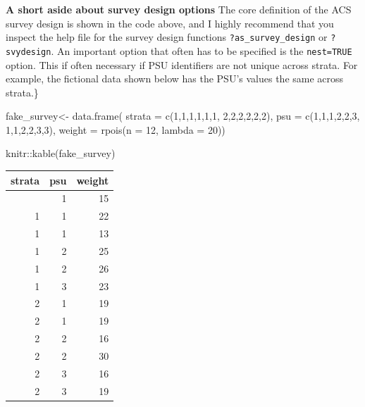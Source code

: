 \documentclass[
  letterpaper,
  DIV=11,
  numbers=noendperiod]{scrreprt}
\newenvironment{Shaded}{\begin{snugshade}}{\end{snugshade}}
\newcommand{\AttributeTok}[1]{\textcolor[rgb]{0.40,0.45,0.13}{#1}}
\newcommand{\DecValTok}[1]{\textcolor[rgb]{0.68,0.00,0.00}{#1}}
\newcommand{\FunctionTok}[1]{\textcolor[rgb]{0.28,0.35,0.67}{#1}}
\newcommand{\NormalTok}[1]{\textcolor[rgb]{0.00,0.23,0.31}{#1}}
\newcommand{\OtherTok}[1]{\textcolor[rgb]{0.00,0.23,0.31}{#1}}
\newcommand{\SpecialCharTok}[1]{\textcolor[rgb]{0.37,0.37,0.37}{#1}}
\begin{document}
\textbf{A short aside about survey design options} The core definition
of the ACS survey design is shown in the code above, and I highly
recommend that you inspect the help file for the survey design functions
\texttt{?as\_survey\_design} or \texttt{?svydesign}. An important option
that often has to be specified is the \texttt{nest=TRUE} option. This if
often necessary if PSU identifiers are not unique across strata. For
example, the fictional data shown below has the PSU's values the same
across strata.\}

\begin{Shaded}
\begin{Highlighting}[]
\NormalTok{fake\_survey}\OtherTok{\textless{}{-}} \FunctionTok{data.frame}\NormalTok{(}
  \AttributeTok{strata =} \FunctionTok{c}\NormalTok{(}\DecValTok{1}\NormalTok{,}\DecValTok{1}\NormalTok{,}\DecValTok{1}\NormalTok{,}\DecValTok{1}\NormalTok{,}\DecValTok{1}\NormalTok{,}\DecValTok{1}\NormalTok{,}
             \DecValTok{2}\NormalTok{,}\DecValTok{2}\NormalTok{,}\DecValTok{2}\NormalTok{,}\DecValTok{2}\NormalTok{,}\DecValTok{2}\NormalTok{,}\DecValTok{2}\NormalTok{),}
  \AttributeTok{psu =} \FunctionTok{c}\NormalTok{(}\DecValTok{1}\NormalTok{,}\DecValTok{1}\NormalTok{,}\DecValTok{1}\NormalTok{,}\DecValTok{2}\NormalTok{,}\DecValTok{2}\NormalTok{,}\DecValTok{3}\NormalTok{,}
          \DecValTok{1}\NormalTok{,}\DecValTok{1}\NormalTok{,}\DecValTok{2}\NormalTok{,}\DecValTok{2}\NormalTok{,}\DecValTok{3}\NormalTok{,}\DecValTok{3}\NormalTok{),}
  \AttributeTok{weight =} \FunctionTok{rpois}\NormalTok{(}\AttributeTok{n =} \DecValTok{12}\NormalTok{, }\AttributeTok{lambda =} \DecValTok{20}\NormalTok{))}

\NormalTok{knitr}\SpecialCharTok{::}\FunctionTok{kable}\NormalTok{(fake\_survey)}
\end{Highlighting}
\end{Shaded}

\begin{longtable}[]{@{}rrr@{}}
\toprule\noalign{}
strata & psu & weight \\
\midrule\noalign{}
\endhead
\bottomrule\noalign{}
\endlastfoot
1 & 1 & 15 \\
1 & 1 & 22 \\
1 & 1 & 13 \\
1 & 2 & 25 \\
1 & 2 & 26 \\
1 & 3 & 23 \\
2 & 1 & 19 \\
2 & 1 & 19 \\
2 & 2 & 16 \\
2 & 2 & 30 \\
2 & 3 & 16 \\
2 & 3 & 19 \\
\end{longtable}
\end{document}
